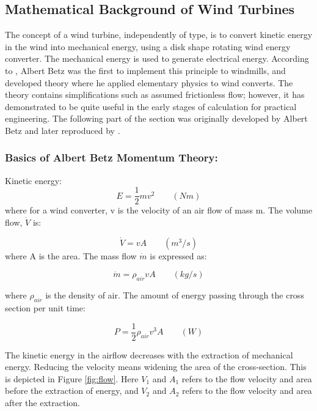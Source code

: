 \subsection{Mathematical Background of Wind Turbines}
The concept of a wind turbine, independently of type, is to convert kinetic energy in the wind into mechanical energy, using a disk shape rotating wind energy converter. The mechanical energy is used to generate electrical energy.  According to \cite{Hau2013},  Albert Betz was the first to implement this principle to windmills, and developed theory where he applied elementary physics to wind converts. The theory contains simplifications such as assumed frictionless flow; however, it has demonstrated to be quite useful in the early stages of calculation for practical engineering. The following part of the section was originally developed by Albert Betz and later reproduced by \cite{Hau2013}.

\subsubsection{Basics of Albert Betz Momentum Theory:}
\noindent Kinetic energy:
\begin{equation}
    E=\frac{1}{2} m v^2 \qquad (Nm)
\end{equation}
 where for a wind converter, v is the velocity of an air flow of mass m. The volume flow, $\dot V$ is:
 
 \begin{equation}
    \dot V= v A \qquad (m^3/s)
\end{equation}
where A is the area. The mass flow $\dot m$ is expressed as:

 \begin{equation}
    \dot m = \rho_{air} v A \qquad (kg/s)
\end{equation}

\noindent where $\rho_{air}$ is the density of air. The amount of energy passing through the cross section per unit time:

 \begin{equation}
    P = \frac{1}{2}\rho_{air} v^3 A \qquad (W)
\end{equation}

\noindent  The kinetic energy in the airflow decreases with the extraction of mechanical energy. Reducing the velocity means widening the area of the cross-section. This is depicted in Figure \ref{fig:flow}. Here $V_1$ and  $A_1$ refers to the flow velocity and area before the extraction of energy, and $V_2$ and $A_2$ refers to the flow velocity and area after the extraction.

